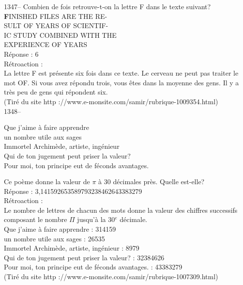 ﻿\documentclass[letterpaper, 12pt]{article}
\begin{document}
1347-- Combien de fois retrouve-t-on la lettre F dans le texte suivant?\\

{\Large\textbf FINISHED FILES ARE THE RE-\\
SULT OF YEARS OF SCIENTIF-\\
IC STUDY COMBINED WITH THE \\
EXPERIENCE OF YEARS}\\


R\'eponse : 6\\

R\'etroaction : \\
La lettre F est pr\'esente six fois dans ce texte. Le cerveau ne
peut pas traiter le mot \og OF\fg .  Si vous avez r\'epondu trois,
vous \^etes dans la moyenne des gens.  Il y a tr\`es peu de gens qui r\'epondent six.  \\
(Tir\'e du site http ://www.e-monsite.com/samir/rubrique-1009354.html)\\

1348-- \begin{center}{Que j'aime \`a faire apprendre\\
un nombre utile aux sages\\
Immortel Archim\`ede, artiste, ing\'enieur\\
Qui de ton jugement peut priser la valeur?\\
Pour moi, ton principe eut de f\'econds avantages.\\}\end{center} Ce
po\`eme donne la valeur de $\pi$ \`a 30 d\'ecimales pr\`es. Quelle
est-elle?\\

R\'eponse : 3,141592653589793238462643383279\\

R\'etroaction : \\
Le nombre de lettres de chacun des mots donne la valeur des chiffres
successifs composant le nombre $\Pi$ jusqu'\`a la 30$^e$ d\'ecimale.\\

Que j'aime \`a faire apprendre : 314159\\
un nombre utile aux sages : 26535\\
Immortel Archim\`ede, artiste, ing\'enieur : 8979\\
Qui de ton jugement peut priser la valeur? : 32384626\\
Pour moi, ton principe eut de f\'econds avantages. : 43383279\\
(Tir\'e du site http ://www.e-monsite.com/samir/rubrique-1007309.html)\\
\end{document}
